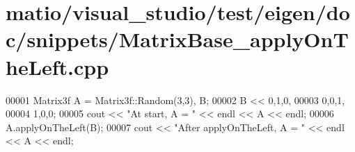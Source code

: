 \hypertarget{matio_2visual__studio_2test_2eigen_2doc_2snippets_2_matrix_base__apply_on_the_left_8cpp_source}{}\section{matio/visual\+\_\+studio/test/eigen/doc/snippets/\+Matrix\+Base\+\_\+apply\+On\+The\+Left.cpp}
\label{matio_2visual__studio_2test_2eigen_2doc_2snippets_2_matrix_base__apply_on_the_left_8cpp_source}

\begin{DoxyCode}
00001 Matrix3f A = Matrix3f::Random(3,3), B;
00002 B << 0,1,0,  
00003      0,0,1,  
00004      1,0,0;
00005 cout << \textcolor{stringliteral}{"At start, A = "} << endl << A << endl;
00006 A.applyOnTheLeft(B); 
00007 cout << \textcolor{stringliteral}{"After applyOnTheLeft, A = "} << endl << A << endl;
\end{DoxyCode}
